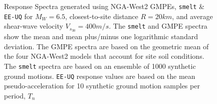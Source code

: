 \begin{figure}[!htbp]
  \caption{Response Spectra generated using NGA-West2 GMPEs,
    \texttt{smelt} \& \texttt{EE-UQ} for $M_W = 6.5$, closest-to-site
    distance $R = 20km$, and average shear-wave velocity $V_{s_{30}} =
    400m/s$. The \texttt{smelt} and GMPE spectra show the mean and
    mean plus/minus one logarithmic standard deviation. The GMPE
    spectra are based on the geometric mean of the four NGA-West2
    models that account for site soil conditions. The \texttt{smelt}
    spectra are based on an ensemble of 1000 synthetic ground
    motions. \texttt{EE-UQ} response values are based on the mean
    pseudo-acceleration for 10 synthetic ground motion samples per
    period, $T_n$}
  \label{fig:stochastic_validation}
\end{figure}
